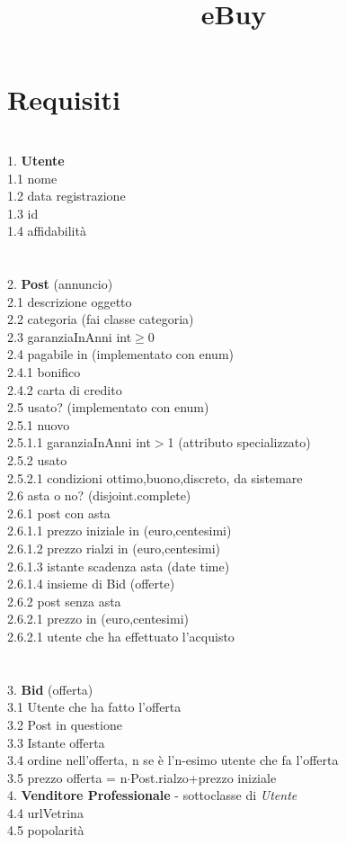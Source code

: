 \documentclass[12pt, letterpaper]{article}
\title{\textbf{eBuy}}
\date{}
\newcommand{\acc}{\\\hphantom{}\\}
\newcommand{\id}{{\hphantom{ident}}}
\begin{document}
\maketitle\section{Requisiti}
\hphantom{a}\\
1.  \textbf{Utente}\\
\id	1.1 nome\\
\id	1.2 data registrazione\\
\id	1.3 id\\
\id 1.4 affidabilità\\
\acc
2.  \textbf{Post} (annuncio)\\
\id2.1 descrizione oggetto\\
\id2.2 categoria (fai classe categoria)\\
\id	2.3 garanziaInAnni int$\ge$0\\
\id	2.4 pagabile in (implementato con enum)\\
\id\id		2.4.1 bonifico\\
\id\id		2.4.2 carta di credito\\
\id	2.5 usato? (implementato con enum)\\
\id\id		2.5.1 nuovo\\
\id\id\id			2.5.1.1 garanziaInAnni int$>$1 (attributo specializzato)\\
\id\id	2.5.2 usato\\
\id\id\id		2.5.2.1 condizioni {ottimo,buono,discreto, da sistemare}\\
\id2.6 asta o no? (disjoint.complete)\\
\id\id		2.6.1 post con asta\\
\id\id\id		2.6.1.1 prezzo iniziale in (euro,centesimi)\\
\id\id\id		2.6.1.2 prezzo rialzi in (euro,centesimi)\\
\id\id\id		2.6.1.3 istante scadenza asta (date time)\\
\id\id\id		2.6.1.4 insieme di Bid (offerte)\\
\id\id	2.6.2 post senza asta\\
        \id\id\id		2.6.2.1 prezzo in (euro,centesimi)\\
        \id\id\id		2.6.2.1 utente che ha effettuato l'acquisto\\
\acc
3. \textbf{Bid} (offerta)\\
\id	3.1 Utente che ha fatto l'offerta\\
\id	3.2 Post in questione\\
    \id	3.3 Istante offerta \\
    \id	3.4 ordine nell'offerta, n se è l'n-esimo utente che fa l'offerta\\
    \id	3.5 prezzo offerta = n$\cdot$Post.rialzo+prezzo iniziale\\
4. \textbf{Venditore Professionale} - sottoclasse di \textit{Utente}\\
\id 4.4 urlVetrina\\
\id 4.5 popolarità\\
\acc
\end{document}
